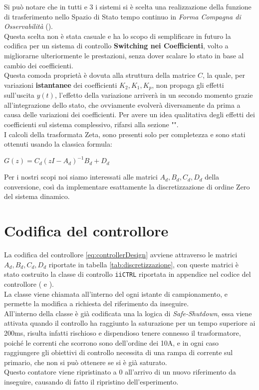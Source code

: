 \noindent
Si può notare che in tutti e 3 i sistemi si è scelta una realizzazione della funzione di trasferimento nello Spazio di Stato tempo continuo in \textit{Forma Compagna di Osservabilità} (\cite{FormeCanoniche}).\\
Questa scelta non è stata casuale e ha lo scopo di semplificare in futuro la codifica per un sistema di controllo \textbf{Switching nei Coefficienti}, volto a migliorarne ulteriormente le prestazioni, senza dover scalare lo stato in base al cambio dei coefficienti.\\
Questa comoda proprietà è dovuta alla struttura della matrice $ C $, la quale, per variazioni \textbf{istantanee} dei coefficienti $ K_2,K_1,K_p$, non propaga gli effetti sull'uscita $ y(t) $, l'effetto della variazione arriverà in un secondo momento grazie all'integrazione dello stato, che ovviamente evolverà diversamente da prima a causa delle variazioni dei coefficienti. Per avere un idea qualitativa degli effetti dei coefficienti sul sistema complessivo, rifarsi alla sezione "".\\
I calcoli della trasformata Zeta, sono presenti solo per completezza e sono stati ottenuti usando la classica formula:\vspace{-5mm}
\begin{center}
	{\Large 		$ G(z) = C_d \left(z I - A_d\right)^{-1} B_d + D_d $}
\end{center}
\noindent
Per i nostri scopi noi siamo interessati alle matrici $ A_d,B_d,C_d,D_d $ della conversione, così da implementare esattamente la discretizzazione di ordine Zero del sistema dinamico.\\
\vspace{-6mm}
\section{Codifica del controllore}\vspace{-4mm}
La codifica del controllore \ref{eq:controllerDesign} avviene attraverso le matrici $ A_d,B_d,C_d,D_d $ riportate in tabella \ref{tab:discretizzazione}, con queste matrici è stato costruito la classe di controllo \verb|iiCTRL| riportata in appendice nel codice del controllore ( e ).\\
La classe viene chiamata all'interno del  ogni istante di campionamento, e permette la modifica a richiesta del riferimento da inseguire.\\
All'interno della classe è già codificata una la logica di \textit{Safe-Shutdown}, essa viene attivata quando il controllo ha raggiunto la saturazione per un tempo superiore ai 200ms, risulta infatti rischioso e dispendioso tenere connesso il trasformatore, poiché le correnti che scorrono sono dell'ordine dei 10A, e in ogni caso raggiungere gli obiettivi di controllo necessita di una rampa di corrente sul primario, che non si può ottenere se si è già saturato.\\
Questo contatore viene ripristinato a 0 all'arrivo di un nuovo riferimento da inseguire, causando di fatto il ripristino dell'esperimento.

